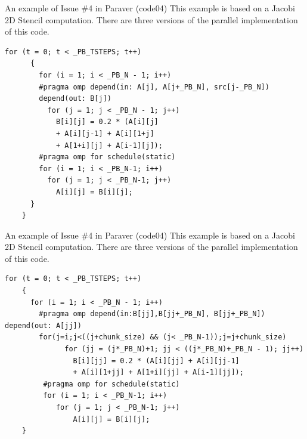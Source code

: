 \documentclass[10pt,xcolor=table]{beamer}
\begin{document}
\begin{frame}[fragile]{An example of Issue \#4 in Paraver (code04)}
This example is based on a Jacobi 2D Stencil computation. There are three versions of the parallel implementation of this code. 
  \begin{lstlisting}[style=shell,gobble=3,basicstyle=\scriptsize\ttfamily,caption={Parallelized with tasks (v1)}]
      for (t = 0; t < _PB_TSTEPS; t++)
      {
        for (i = 1; i < _PB_N - 1; i++)
        #pragma omp depend(in: A[j], A[j+_PB_N], src[j-_PB_N]) 
        depend(out: B[j])   
          for (j = 1; j < _PB_N - 1; j++)
            B[i][j] = 0.2 * (A[i][j] 
            + A[i][j-1] + A[i][1+j] 
            + A[1+i][j] + A[i-1][j]);
        #pragma omp for schedule(static) 
        for (i = 1; i < _PB_N-1; i++)
          for (j = 1; j < _PB_N-1; j++)
            A[i][j] = B[i][j];
      }
    }
  \end{lstlisting}
\end{frame}


\begin{frame}[fragile]{An example of Issue \#4 in Paraver (code04)}
This example is based on a Jacobi 2D Stencil computation. There are three versions of the parallel implementation of this code. 
  \begin{lstlisting}[style=shell,gobble=3,basicstyle=\scriptsize\ttfamily,caption={Parallelized with tasks (v2)}]
    for (t = 0; t < _PB_TSTEPS; t++)
    {
      for (i = 1; i < _PB_N - 1; i++)
	    #pragma omp depend(in:B[jj],B[jj+_PB_N], B[jj+_PB_N]) depend(out: A[jj])
        for(j=i;j<((j+chunk_size) && (j< _PB_N-1));j=j+chunk_size)
              for (jj = (j*_PB_N)+1; jj < ((j*_PB_N)+_PB_N - 1); jj++)
                B[i][jj] = 0.2 * (A[i][jj] + A[i][jj-1] 
                + A[i][1+jj] + A[1+i][jj] + A[i-1][jj]);
	     #pragma omp for schedule(static) 
         for (i = 1; i < _PB_N-1; i++)
            for (j = 1; j < _PB_N-1; j++)
                A[i][j] = B[i][j];
    }
  \end{lstlisting}
\end{frame}
\end{document}
